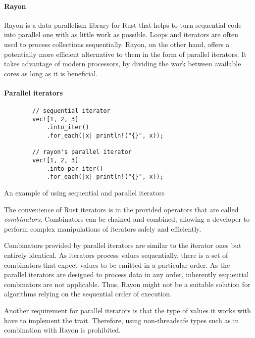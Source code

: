 \paragraph{Rayon}
Rayon is a data parallelism library for Rust that helps to turn sequential code into parallel one with as little work as possible. Loops and iterators are often used to process collections sequentially. Rayon, on the other hand, offers a potentially more efficient alternative to them in the form of parallel iterators. It takes advantage of modern processors, by dividing the work between available cores as long as it is beneficial.

\paragraph{Parallel iterators}
\begin{listing}[!htbp]
    \centering

    \begin{verbatim}
        // sequential iterator
        vec![1, 2, 3]
            .into_iter()
            .for_each(|x| println!("{}", x));

        // rayon's parallel iterator
        vec![1, 2, 3]
            .into_par_iter()
            .for_each(|x| println!("{}", x));
    \end{verbatim}

    \caption{An example of using sequential and parallel iterators}
    \label{lst:par-iter-example}
\end{listing}

The convenience of Rust iterators is in the provided operators that are called \emph{combinators}. Combinators can be chained and combined, allowing a developer to perform complex manipulations of iterators safely and efficiently.

Combinators provided by parallel iterators are similar to the iterator ones but entirely identical. As iterators process values sequentially, there is a set of combinators that expect values to be emitted in a particular order. As the parallel iterators are designed to process data in any order, inherently sequential combinators are not applicable. Thus, Rayon might not be a suitable solution for algorithms relying on the sequential order of execution.

Another requirement for parallel iterators is that the type of values it works with have to implement the  trait. Therefore, using non-threadsafe types such as \rc{} in combination with Rayon is prohibited.


